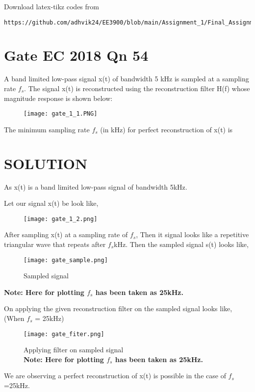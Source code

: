 \documentclass[journal,12pt,twocolumn]{IEEEtran}
\begin{document}
%
Download latex-tikz codes from 
%
\begin{lstlisting}
https://github.com/adhvik24/EE3900/blob/main/Assignment_1/Final_Assignment_1.tex
\end{lstlisting}
\section{Gate EC 2018 Qn 54}
A band limited low-pass signal x(t) of bandwidth 5 kHz is sampled at a sampling rate $f_s$.
The signal x(t) is reconstructed using the reconstruction filter H(f) whose magnitude response is shown below:

\begin{figure}[htp]
    \centering
    \texttt{[image: gate\_1\_1.PNG]}
\end{figure}

The minimum sampling rate $f_s$ (in kHz) for perfect reconstruction of x(t) is
\section{SOLUTION}
As x(t) is a band limited low-pass signal of bandwidth 5kHz.

Let our signal x(t) be look like,
\begin{figure}[htp]
    \centering
    \texttt{[image: gate\_1\_2.png]}
\end{figure}

After sampling x(t) at a sampling rate of $f_s$, Then it signal looks like a repetitive triangular wave that repeats after $f_s$kHz.
Then the sampled signal s(t) looks like,
\begin{figure}[htp]
    \centering
    \texttt{[image: gate\_sample.png]}
    \caption{Sampled signal}
\end{figure}

\textbf{Note: Here for plotting $f_s$ has been taken as 25kHz.}

On applying the given reconstruction filter on the sampled signal looks like,
(When $f_s$ = 25kHz)
\begin{figure}[htp]
    \centering
    \texttt{[image: gate\_fiter.png]}
    \caption{Applying filter on sampled signal
    \\\textbf{Note: Here for plotting $f_s$ has been taken as 25kHz.}}
\end{figure}

We are observing a perfect reconstruction of x(t) is possible in the case of $f_s$=25kHz.
\end{document}

